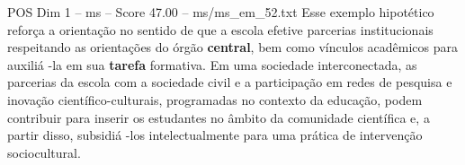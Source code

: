 \begin{textsample}{POS Dim 1 – ms – Score 47.00 – ms/ms\_em\_52.txt}
Esse exemplo hipotético reforça a orientação no sentido de que a escola efetive parcerias institucionais respeitando as orientações do órgão \textbf{central}, bem como vínculos acadêmicos para auxiliá -la em sua \textbf{tarefa} formativa.
Em uma sociedade interconectada, as parcerias da escola com a sociedade civil e a participação em redes de pesquisa e inovação científico-culturais, programadas no contexto da educação, podem contribuir para inserir os estudantes no âmbito da comunidade científica e, a partir disso, subsidiá -los intelectualmente para uma prática de intervenção sociocultural.

\end{textsample}
